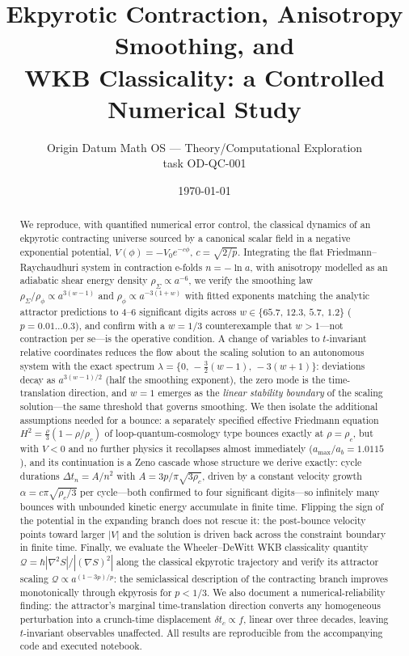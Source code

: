 \documentclass[11pt,a4paper]{article}
\title{\bfseries Ekpyrotic Contraction, Anisotropy Smoothing, and\\
WKB Classicality: a Controlled Numerical Study}
\author{Origin Datum Math OS --- Theory/Computational Exploration\\
\small task OD-QC-001}
\date{\today}
\newcommand{\rhophi}{\rho_\phi}
\newcommand{\rhoSigma}{\rho_\Sigma}
\newcommand{\rhoc}{\rho_c}
\newcommand{\cQ}{\mathcal{Q}}
\begin{document}
\maketitle

\begin{abstract}
We reproduce, with quantified numerical error control, the classical
dynamics of an ekpyrotic contracting universe sourced by a canonical scalar
field in a negative exponential potential, $V(\phi)=-V_0 e^{-c\phi}$,
$c=\sqrt{2/p}$. Integrating the flat Friedmann--Raychaudhuri system in
contraction e-folds $n=-\ln a$, with anisotropy modelled as an adiabatic
shear energy density $\rhoSigma\propto a^{-6}$, we verify the smoothing law
$\rhoSigma/\rhophi\propto a^{3(w-1)}$ and $\rhophi\propto a^{-3(1+w)}$ with
fitted exponents matching the analytic attractor predictions to 4--6
significant digits across $w\in\{65.7,\,12.3,\,5.7,\,1.2\}$ ($p=0.01\ldots
0.3$), and confirm with a $w=1/3$ counterexample that $w>1$---not contraction
per se---is the operative condition. A change of variables to
$t$-invariant relative coordinates reduces the flow about the scaling
solution to an autonomous system with the exact spectrum
$\lambda=\{0,\,-\frac32(w-1),\,-3(w+1)\}$: deviations decay as
$a^{3(w-1)/2}$ (half the smoothing exponent), the zero mode is the
time-translation direction, and $w=1$ emerges as the \emph{linear
stability boundary} of the scaling solution---the same threshold that
governs smoothing. We then isolate the additional assumptions needed for a
bounce: a separately specified effective Friedmann equation
$H^2=\frac{\rho}{3}(1-\rho/\rhoc)$ of loop-quantum-cosmology type bounces
exactly at $\rho=\rhoc$, but with $V<0$ and no further physics it
recollapses almost immediately ($a_{\max}/a_b=1.0115$), and its
continuation is a Zeno cascade whose structure we derive exactly: cycle
durations $\Delta t_n=A/n^2$ with $A=3p/\pi\sqrt{3\rhoc}$, driven by a
constant velocity growth $\alpha=c\pi\sqrt{\rhoc/3}$ per cycle---both
confirmed to four significant digits---so infinitely many bounces with
unbounded kinetic energy accumulate in finite time. Flipping the sign of the
potential in the expanding branch does not rescue it: the post-bounce
velocity points toward larger $|V|$ and the solution is driven back across
the constraint boundary in finite time. Finally, we evaluate the
Wheeler--DeWitt WKB classicality quantity
$\cQ=\hbar|\nabla^2S|/|(\nabla S)^2|$ along the classical ekpyrotic
trajectory and verify its attractor scaling $\cQ\propto a^{(1-3p)/p}$: the
semiclassical description of the contracting branch improves monotonically
through ekpyrosis for $p<1/3$. We also document a numerical-reliability
finding: the attractor's marginal time-translation direction converts any
homogeneous perturbation into a crunch-time displacement
$\delta t_c\propto f$, linear over three decades, leaving $t$-invariant
observables unaffected. All results are reproducible from the accompanying
code and executed notebook.
\end{abstract}
\end{document}
